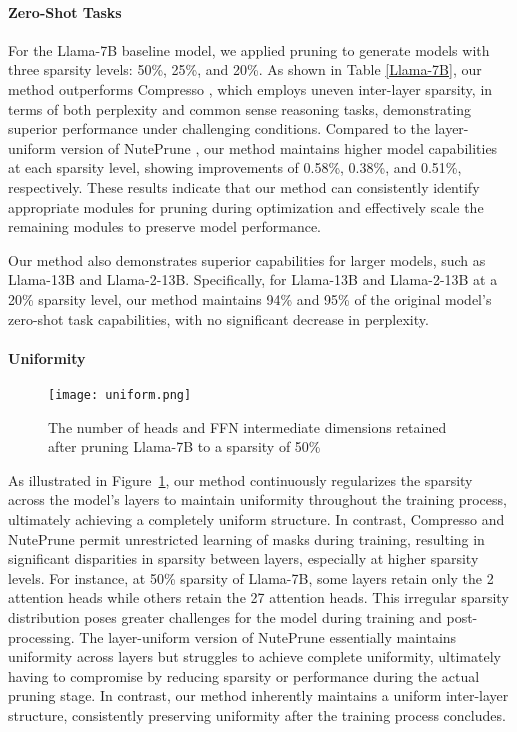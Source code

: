 \paragraph{Zero-Shot Tasks}

For the Llama-7B baseline model, we applied pruning to generate models with three sparsity levels: 50\%, 25\%, and 20\%. As shown in Table \ref{Llama-7B}, our method outperforms Compresso \cite{guo2023compresso}, which employs uneven inter-layer sparsity, in terms of both perplexity and common sense reasoning tasks, demonstrating superior performance under challenging conditions. Compared to the layer-uniform version of NutePrune \cite{li2024nuteprune}, our method maintains higher model capabilities at each sparsity level, showing improvements of 0.58\%, 0.38\%, and 0.51\%, respectively. These results indicate that our method can consistently identify appropriate modules for pruning during optimization and effectively scale the remaining modules to preserve model performance.

Our method also demonstrates superior capabilities for larger models, such as Llama-13B and Llama-2-13B. Specifically, for Llama-13B and Llama-2-13B at a 20\% sparsity level, our method maintains 94\% and 95\% of the original model's zero-shot task capabilities, with no significant decrease in perplexity. 

\paragraph{Uniformity}

\begin{figure}
    \centering
    \texttt{[image: uniform.png]}
    \caption{The number of heads and FFN intermediate dimensions retained after pruning Llama-7B to a sparsity of 50\% }
    \label{fig:uniform}
\end{figure}

As illustrated in Figure~\ref{fig:uniform}, our method continuously regularizes the sparsity across the model's layers to maintain uniformity throughout the training process, ultimately achieving a completely uniform structure. In contrast, Compresso and NutePrune permit unrestricted learning of masks during training, resulting in significant disparities in sparsity between layers, especially at higher sparsity levels. For instance, at 50\% sparsity of Llama-7B, some layers retain only the 2 attention heads while others retain the 27 attention heads. This irregular sparsity distribution poses greater challenges for the model during training and post-processing. The layer-uniform version of NutePrune essentially maintains uniformity across layers but struggles to achieve complete uniformity, ultimately having to compromise by reducing sparsity or performance during the actual pruning stage. In contrast, our method inherently maintains a uniform inter-layer structure, consistently preserving uniformity after the training process concludes.


